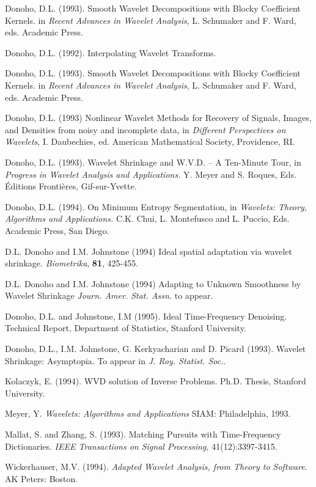 \begin{thebibliography}{99}
Donoho, D.L. (1993).
Smooth Wavelet Decompositions with Blocky Coefficient
Kernels.  in {\it Recent Advances in Wavelet Analysis},
L. Schumaker and F. Ward, eds. Academic Press.

Donoho, D.L. (1992).
Interpolating Wavelet Transforms. 

Donoho, D.L. (1993).
Smooth Wavelet Decompositions with Blocky Coefficient
Kernels.  in {\it Recent Advances in Wavelet Analysis},
L. Schumaker and F. Ward, eds. Academic Press.

Donoho, D.L. (1993)
{ Nonlinear Wavelet Methods for Recovery
of Signals, Images, and Densities from
noisy and incomplete data},
in {\it Different Perspectives on Wavelets},
I. Daubechies, ed. American Mathematical Society, Providence, RI.

Donoho, D.L. (1993).
Wavelet Shrinkage and W.V.D. -- A Ten-Minute Tour,
in {\it Progress in Wavelet Analysis and Applications.}
Y. Meyer and S. Roques, Eds. \'Editions Fronti\`eres, Gif-sur-Yvette.

Donoho, D.L. (1994).
On Minimum Entropy Segmentation,
in {\it Wavelets: Theory, Algorithms and Applications.}
C.K. Chui, L. Montefusco and L. Puccio, Eds.
Academic Press, San Diego.

D.L. Donoho and I.M. Johnstone (1994)
Ideal spatial adaptation via wavelet shrinkage.
{\it Biometrika}, {\bf 81}, 425-455.

D.L. Donoho and I.M. Johnstone (1994)
Adapting to Unknown Smoothness by Wavelet Shrinkage
{\it Journ. Amer. Stat. Assn.} to appear.

Donoho, D.L. and Johnstone, I.M (1995). Ideal Time-Frequency
Denoising. Technical Report, Department of Statistics,
Stanford University.

Donoho, D.L., I.M. Johnstone, G. Kerkyacharian and D. Picard (1993).
Wavelet Shrinkage: Asymptopia.  To appear in {\it J. Roy. Statist. Soc.\/}.

Kolaczyk, E. (1994). WVD solution of Inverse Problems.
Ph.D. Thesis, Stanford University.

Meyer, Y. {\it Wavelets: Algorithms and Applications}
SIAM: Philadelphia, 1993.

Mallat, S. and Zhang, S. (1993).   Matching Pursuits with
Time-Frequency Dictionaries.  {\it IEEE Transactions on
Signal Processing,} 41(12):3397-3415.

Wickerhauser, M.V. (1994).
{\it Adapted Wavelet Analysis, from Theory to Software}.  AK Peters: Boston.

\end{thebibliography}



